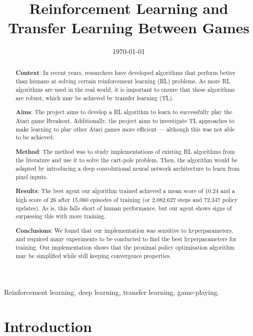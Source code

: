 \documentclass[12pt,a4paper]{article}
\title{Reinforcement Learning and \\ Transfer Learning Between Games}
\author{} %
\date{\today}
\begin{document}
\maketitle

\begin{abstract}
{\bf Context}: In recent years, researchers have developed algorithms that perform better than humans at solving certain reinforcement learning (RL) problems. As more RL algorithms are used in the real world, it is important to ensure that these algorithms are robust, which may be achieved by transfer learning (TL).

{\bf Aims}: The project aims to develop a RL algorithm to learn to successfully play the Atari game Breakout. Additionally, the project aims to investigate TL approaches to make learning to play other Atari games more efficient --- although this was not able to be achieved.

{\bf Method}: The method was to study implementations of existing RL algorithms from the literature and use it to solve the cart-pole problem. Then, the algorithm would be adapted by introducing a deep convolutional neural network architecture to learn from pixel inputs.

{\bf Results}: The best agent our algorithm trained achieved a mean score of 10.24 and a high score of 26 after 15,060 episodes of training (or 2,082,627 steps and 72,347 policy updates). As is, this falls short of human performance, but our agent shows signs of surpassing this with more training.

{\bf Conclusions}: We found that our implementation was sensitive to hyperparameters, and required many experiments to be conducted to find the best hyperparameters for training. Our implementation shows that the proximal policy optimisation algorithm may be simplified  while still keeping convergence properties.
\end{abstract}

\begin{keywords}
Reinforcement learning, deep learning, transfer learning, game-playing.
\end{keywords}

\section{Introduction}
\end{document}

